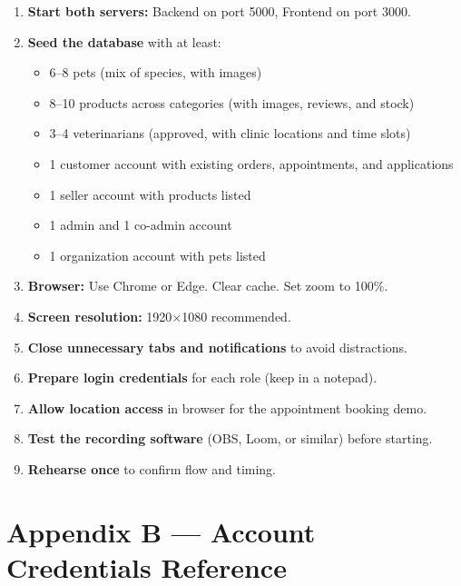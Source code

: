\documentclass[12pt,a4paper]{article}
\begin{document}
\begin{tcolorbox}[colback=red!3, colframe=red!40!black, title=\textbf{Before You Hit Record}]
\begin{enumerate}[nosep]
  \item \textbf{Start both servers:} Backend on port 5000, Frontend on port 3000.
  \item \textbf{Seed the database} with at least:
    \begin{itemize}[nosep]
      \item 6--8 pets (mix of species, with images)
      \item 8--10 products across categories (with images, reviews, and stock)
      \item 3--4 veterinarians (approved, with clinic locations and time slots)
      \item 1 customer account with existing orders, appointments, and applications
      \item 1 seller account with products listed
      \item 1 admin and 1 co-admin account
      \item 1 organization account with pets listed
    \end{itemize}
  \item \textbf{Browser:} Use Chrome or Edge. Clear cache. Set zoom to 100\%.
  \item \textbf{Screen resolution:} 1920$\times$1080 recommended.
  \item \textbf{Close unnecessary tabs and notifications} to avoid distractions.
  \item \textbf{Prepare login credentials} for each role (keep in a notepad).
  \item \textbf{Allow location access} in browser for the appointment booking demo.
  \item \textbf{Test the recording software} (OBS, Loom, or similar) before starting.
  \item \textbf{Rehearse once} to confirm flow and timing.
\end{enumerate}
\end{tcolorbox}

\vspace{0.5cm}

\section*{Appendix B --- Account Credentials Reference}
\end{document}
